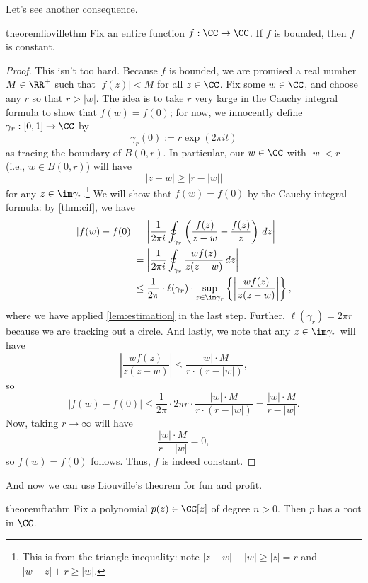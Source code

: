 Let's see another consequence.
\begin{restatable}[Liouville's]{theorem}{liovillethm} \label{thm:liouville}
	Fix an entire function $f:\CC\to\CC$. If $f$ is bounded, then $f$ is constant.
\end{restatable}
\begin{proof}
	This isn't too hard. Because $f$ is bounded, we are promised a real number $M\in\RR^+$ such that $|f(z)|<M$ for all $z\in\CC$. Fix some $w\in\CC$, and choose any $r$ so that $r>|w|$. The idea is to take $r$ very large in the Cauchy integral formula to show that $f(w)=f(0)$; for now, we innocently define $\gamma_r:[0,1]\to\CC$ by
	\[\gamma_r(0):=r\exp(2\pi it)\]
	as tracing the boundary of $B(0,r)$. In particular, our $w\in\CC$ with $|w|<r$ (i.e., $w\in B(0,r)$) will have
	\[|z-w|\ge|r-|w||\]
	for any $z\in\im\gamma_r$.\footnote{This is from the triangle inequality: note $|z-w|+|w|\ge|z|=r$ and $|w-z|+r\ge|w|$.} We will show that $f(w)=f(0)$ by the Cauchy integral formula: by \autoref{thm:cif}, we have
	\begin{align*}
		|f(w)-f(0)| &= \left|\frac1{2\pi i}\oint_{\gamma_r}\left(\frac{f(z)}{z-w}-\frac{f(z)}z\right)\,dz\right| \\
		&= \left|\frac1{2\pi i}\oint_{\gamma_r}\frac{wf(z)}{z(z-w)}\,dz\right| \\
		&\le \frac1{2\pi}\cdot\ell(\gamma_r)\cdot\sup_{z\in\im\gamma_r}\left\{\left|\frac{wf(z)}{z(z-w)}\right|\right\},
	\end{align*}
	where we have applied \autoref{lem:estimation} in the last step. Further, $\ell(\gamma_r)=2\pi r$ because we are tracking out a circle. And lastly, we note that any $z\in\im\gamma_r$ will have
	\[\left|\frac{wf(z)}{z(z-w)}\right|\le\frac{|w|\cdot M}{r\cdot(r-|w|)},\]
	so
	\[|f(w)-f(0)|\le\frac1{2\pi}\cdot2\pi r\cdot\frac{|w|\cdot M}{r\cdot(r-|w|)}=\frac{|w|\cdot M}{r-|w|}.\]
	Now, taking $r\to\infty$ will have
	\[\frac{|w|\cdot M}{r-|w|}=0,\]
	so $f(w)=f(0)$ follows. Thus, $f$ is indeed constant.
\end{proof}
And now we can use Liouville's theorem for fun and profit.
\begin{restatable}{theorem}{ftathm}
	Fix a polynomial $p(z)\in\CC[z]$ of degree $n>0$. Then $p$ has a root in $\CC$.
\end{restatable}
